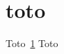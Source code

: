 \documentclass{article}
\begin{document}
\section{toto}\label{titi}
Toto~\ref{titi}
Toto \cite{CL12}

\end{document}
